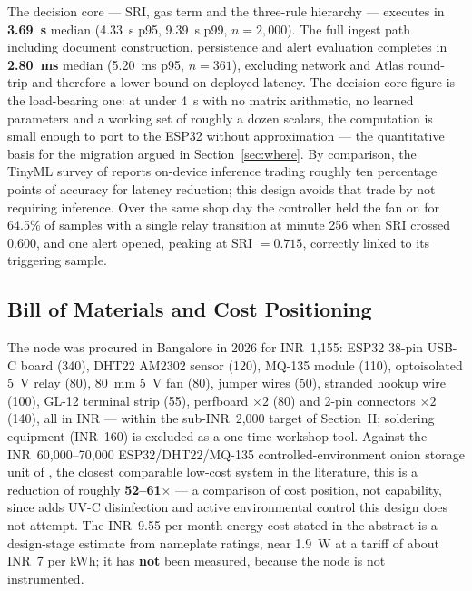 \documentclass[conference]{IEEEtran}
\newcommand{\INR}{INR~}
\begin{document}
The decision core --- SRI, gas term and the three-rule hierarchy ---
executes in \textbf{3.69~\textmu s} median (4.33~\textmu s p95,
9.39~\textmu s p99, $n = 2{,}000$). The full ingest path including
document construction, persistence and alert evaluation completes in
\textbf{2.80~ms} median (5.20~ms p95, $n = 361$), excluding network and
Atlas round-trip and therefore a lower bound on deployed latency. The decision-core figure is the load-bearing one: at under
4~\textmu s with no matrix arithmetic, no learned parameters and a working
set of roughly a dozen scalars, the computation is small enough to port to
the ESP32 without approximation --- the quantitative basis for the
migration argued in Section~\ref{sec:where}. By comparison, the TinyML
survey of \cite{heydari2025} reports on-device inference trading roughly
ten percentage points of accuracy for latency reduction; this design
avoids that trade by not requiring inference. Over the same shop day the
controller held the fan on for 64.5\% of samples with a single relay
transition at minute 256 when SRI crossed 0.600, and one alert opened,
peaking at SRI $= 0.715$, correctly linked to its triggering sample.

\subsection{Bill of Materials and Cost Positioning}

The node was procured in Bangalore in 2026 for \INR{}1{,}155: ESP32
38-pin USB-C board (340), DHT22 AM2302 sensor (120), MQ-135 module (110),
optoisolated 5~V relay (80), 80~mm 5~V fan (80), jumper wires (50),
stranded hookup wire (100), GL-12 terminal strip (55), perfboard $\times
2$ (80) and 2-pin connectors $\times 2$ (140), all in INR --- within the
sub-\INR{}2{,}000 target of Section~II; soldering equipment (\INR{}160) is
excluded as a one-time workshop tool. Against the
\INR{}60{,}000--70{,}000 ESP32/DHT22/MQ-135 controlled-environment onion
storage unit of \cite{kumar2026}, the closest comparable low-cost system
in the literature, this is a reduction of roughly
\textbf{52--61$\times$} --- a comparison of cost position, not
capability, since \cite{kumar2026} adds UV-C disinfection and active
environmental control this design does not attempt. The \INR{}9.55 per
month energy cost stated in the abstract is a design-stage estimate from
nameplate ratings, near 1.9~W at a tariff of about \INR{}7 per kWh; it has
\textbf{not} been measured, because the node is not instrumented.
\end{document}
